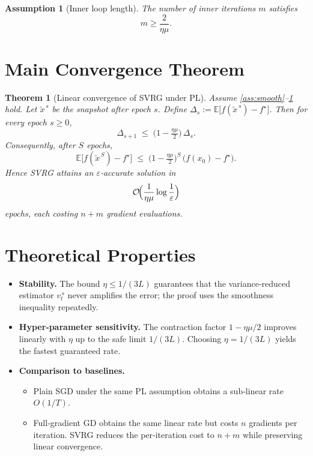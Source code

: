 \documentclass{article}
\newtheorem{theorem}{Theorem}
\newtheorem{assumption}{Assumption}
\begin{document}
\begin{assumption}[Inner loop length]\label{ass:inner}
The number of inner iterations $m$ satisfies
\[
m\ge \frac{2}{\eta\mu}.
\]
\end{assumption}

\section*{Main Convergence Theorem}
\begin{theorem}[Linear convergence of SVRG under PL]\label{thm:linear}
Assume \ref{ass:smooth}–\ref{ass:inner} hold. Let $\tilde{x}^{\,s}$ be the snapshot after epoch $s$.
Define $\Delta_s:=\mathbb{E}\!\bigl[f(\tilde{x}^{\,s})-f^\star\bigr]$.
Then for every epoch $s\ge0$,
\[
\Delta_{s+1}\;\le\;\bigl(1-\tfrac{\eta\mu}{2}\bigr)\,\Delta_s .
\]
Consequently, after $S$ epochs,
\[
\mathbb{E}\!\bigl[f(\tilde{x}^{\,S})-f^\star\bigr]\;\le\;
\bigl(1-\tfrac{\eta\mu}{2}\bigr)^{S}\,\bigl(f(x_0)-f^\star\bigr).
\]
Hence SVRG attains an $\varepsilon$‑accurate solution in
\[
\mathcal{O}\!\Bigl(\frac{1}{\eta\mu}\log\frac{1}{\varepsilon}\Bigr)
\]
epochs, each costing $n+m$ gradient evaluations.
\end{theorem}

\section*{Theoretical Properties}
\begin{itemize}
\item \textbf{Stability.} The bound $\eta\le 1/(3L)$ guarantees that the variance‑reduced estimator $v_t^{\,s}$ never amplifies the error; the proof uses the smoothness inequality repeatedly.
\item \textbf{Hyper‑parameter sensitivity.} The contraction factor $1-\eta\mu/2$ improves linearly with $\eta$ up to the safe limit $1/(3L)$. Choosing $\eta=1/(3L)$ yields the fastest guaranteed rate.
\item \textbf{Comparison to baselines.}
    \begin{itemize}
        \item Plain SGD under the same PL assumption obtains a sub‑linear rate $O(1/T)$.
        \item Full‑gradient GD obtains the same linear rate but costs $n$ gradients per iteration. SVRG reduces the per‑iteration cost to $n+m$ while preserving linear convergence.
    \end{itemize}
\end{itemize}
\end{document}
